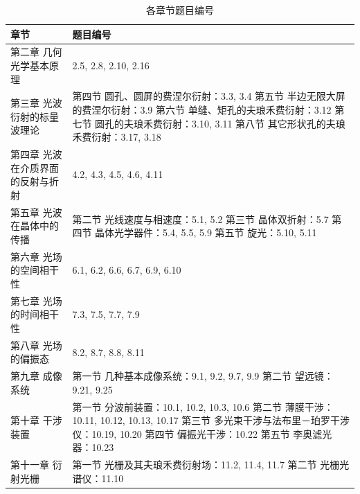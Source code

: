 \documentclass[a4paper]{article}
\begin{document}
\begin{table}[htbp]
\caption{各章节题目编号}
\centering
\renewcommand{\arraystretch}{1.2}
\begin{tabularx}{\textwidth}{@{}l|X@{}}
\toprule
章节 & 题目编号 \\
\midrule
第二章 几何光学基本原理 & 2.5, 2.8, 2.10, 2.16 \\
\midrule
第三章 光波衍射的标量波理论 & 
第四节 圆孔、圆屏的费涅尔衍射：3.3, 3.4 \newline
第五节 半边无限大屏的费涅尔衍射：3.9 \newline
第六节 单缝、矩孔的夫琅禾费衍射：3.12 \newline
第七节 圆孔的夫琅禾费衍射：3.10, 3.11 \newline
第八节 其它形状孔的夫琅禾费衍射：3.17, 3.18 \\
\midrule
第四章 光波在介质界面的反射与折射 & 4.2, 4.3, 4.5, 4.6, 4.11 \\
\midrule
第五章 光波在晶体中的传播 & 
第二节 光线速度与相速度：5.1, 5.2 \newline
第三节 晶体双折射：5.7 \newline
第四节 晶体光学器件：5.4, 5.5, 5.9 \newline
第五节 旋光：5.10, 5.11 \\
\midrule
第六章 光场的空间相干性 & 6.1, 6.2, 6.6, 6.7, 6.9, 6.10 \\
\midrule
第七章 光场的时间相干性 & 7.3, 7.5, 7.7, 7.9 \\
\midrule
第八章 光场的偏振态 & 8.2, 8.7, 8.8, 8.11 \\
\midrule
第九章 成像系统 & 
第一节 几种基本成像系统：9.1, 9.2, 9.7, 9.9 \newline
第二节 望远镜：9.21, 9.25 \\
\midrule
第十章 干涉装置 & 
第一节 分波前装置：10.1, 10.2, 10.3, 10.6 \newline
第二节 薄膜干涉：10.11, 10.12, 10.13, 10.17 \newline
第三节 多光束干涉与法布里－珀罗干涉仪：10.19, 10.20 \newline
第四节 偏振光干涉：10.22 \newline
第五节 李奥滤光器：10.23 \\
\midrule
第十一章 衍射光栅 & 
第一节 光栅及其夫琅禾费衍射场：11.2, 11.4, 11.7 \newline
第二节 光栅光谱仪：11.10 \\
\bottomrule
\end{tabularx}
\end{table}
\newpage
\end{document}
